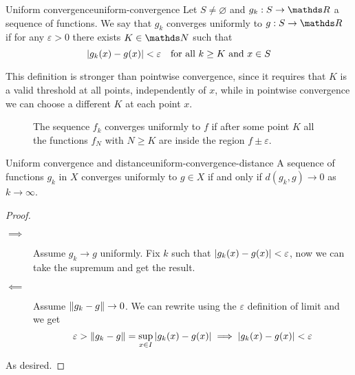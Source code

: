 \documentclass[12pt]{extarticle}
\begin{document}
\begin{definition}{Uniform convergence}{uniform-convergence}
	Let $S \neq \varnothing$ and $g_k : S \to \R$ a sequence of functions.
	We say that $g_k$ converges uniformly to $g: S \to \R$ if for any $\varepsilon > 0$ there exists $K \in \N$ such that
	\begin{equation}
		\abs{g_k(x) - g(x)} < \varepsilon \quad \text{for all } k \geq K \text{ and } x \in S
	\end{equation}
\end{definition}
This definition is stronger than pointwise convergence, since it requires that $K$ is a valid threshold at all points,
independently of $x$, while in pointwise convergence we can choose a different $K$ at each point $x$.

\begin{figure}[H]
	\centering
	
	\caption{The sequence $f_k$ converges uniformly to $f$ if after some point $K$ all the functions $f_N$ with $N \geq K$ are inside the region $f\pm \varepsilon$.}
\end{figure}

\begin{proposition}{Uniform convergence and distance}{uniform-convergence-distance}
	A sequence of functions $g_k$ in $X$ converges uniformly to $g \in X$ if and only if
	$d(g_k, g) \to 0$ as $k \to \infty$.
\end{proposition}
\begin{proof}
	\skiplineafterproof
	\begin{description}
		\item[$\implies$]
		      Assume $g_k \to g$ uniformly.
		      Fix $k$ such that $\abs{g_k(x) -g(x)} < \varepsilon$, now we can take the supremum and get the result.
		\item[$\impliedby$]
		      Assume $\norm{g_k - g} \to 0$.
		      We can rewrite using the $\varepsilon$ definition of limit and we get
		      \begin{equation}
			      \varepsilon > \norm{g_k - g} = \sup_{x \in I}\abs{g_k(x)-g(x)} \implies \abs{g_k(x) - g(x)} < \varepsilon
		      \end{equation}
	\end{description}
	As desired.
\end{proof}
\end{document}
